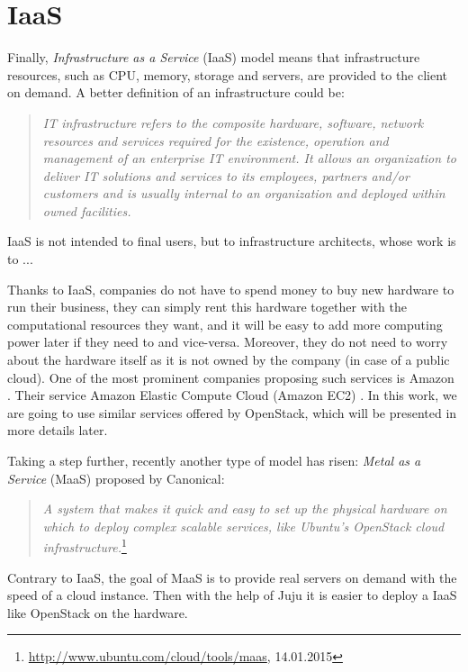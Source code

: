 \section{IaaS}
Finally, \textit{Infrastructure as a Service} (IaaS) model means that infrastructure resources, such as CPU, memory, storage and servers, are provided to the client on demand. A better definition of an infrastructure could be:
\begin{quotation}
\textit{
IT infrastructure refers to the composite hardware, software, network resources and services required for the existence, operation and management of an enterprise IT environment. It allows an organization to deliver IT solutions and services to its employees, partners and/or customers and is usually internal to an organization and deployed within owned facilities.
}\cite{cjanssen14}
\end{quotation}

IaaS is not intended to final users, but to infrastructure architects, whose work is to ...

Thanks to IaaS, companies do not have to spend money to buy new hardware to run their business, they can simply rent this hardware together with the computational resources they want, and it will be easy to add more computing power later if they need to and vice-versa. 
Moreover, they do not need to worry about the hardware itself as it is not owned by the company (in case of a public cloud). 
One of the most prominent companies proposing such services is Amazon . 
Their service Amazon Elastic Compute Cloud (Amazon EC2) . 
In this work, we are going to use similar services offered by OpenStack, which will be presented in more details later.

Taking a step further, recently another type of model has risen: \textit{Metal as a Service} (MaaS) proposed by Canonical:
\begin{quotation}
\textit{A system that makes it quick and easy to set up the physical hardware on which to deploy complex scalable services, like Ubuntu’s OpenStack cloud infrastructure.}\footnote{\url{http://www.ubuntu.com/cloud/tools/maas}, 14.01.2015}
\end{quotation}

Contrary to IaaS, the goal of MaaS is to provide real servers on demand with the speed of a cloud instance. Then with the help of Juju it is easier to deploy a IaaS like OpenStack on the hardware.






